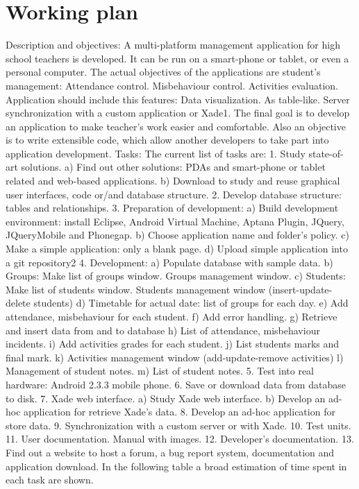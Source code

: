 \chapter{Working plan}


Description and objectives:
	A multi-platform management application for high school teachers is developed. It can be run on a smart-phone or tablet, or even a personal computer. 
	The actual objectives of the applications are student's management:
Attendance control.
Misbehaviour control.
Activities evaluation.
	Application should include this features:
Data visualization. As table-like.
Server synchronization with a custom application or Xade1.
	The final goal is to develop an application to make teacher's work easier and comfortable. Also an objective is to write extensible code, which allow another developers to take part into application development.
Tasks:
	The current list of tasks are:
 1. Study state-of-art solutions. 
 a) Find out other solutions: PDAs and smart-phone or tablet related and web-based applications.
 b) Download to study and reuse graphical user interfaces, code or/and database structure. 
 2. Develop database structure: tables and relationships. 
 3. Preparation of development:
 a) Build development environment: install Eclipse, Android Virtual Machine, Aptana Plugin, JQuery, JQueryMobile and Phonegap.
 b) Choose application name and folder's policy.
 c) Make a simple application: only a blank page.
 d) Upload simple application into a git repository2
 4. Development:
 a) Populate database with sample data.
 b) Groups:
Make list of groups window.
Groups management window.
 c) Students:
Make list of students window.
Students management window (insert-update-delete students)
 d) Timetable for actual date: list of groups for each day.
 e) Add attendance, misbehaviour for each student.
 f) Add error handling.
 g) Retrieve and insert data from and to database
 h) List of attendance, misbehaviour incidents.
 i) Add activities grades for each student.
 j) List students marks and final mark.
 k) Activities management window (add-update-remove activities)
 l) Management of student notes.
 m) List of student notes. 
 5. Test into real hardware: Android 2.3.3 mobile phone.
 6. Save or download data from database to disk.
 7. Xade web interface.
 a) Study Xade web interface.
 b) Develop an ad-hoc application for retrieve Xade's data. 
 8. Develop an ad-hoc application for store data. 
 9. Synchronization with a custom server or with Xade.
 10. Test units.
 11. User documentation. Manual with images.
 12. Developer's documentation.
 13. Find out a website to host a forum, a bug report system,  documentation and application download.
In the following table a broad estimation of time spent in each task are shown.  

